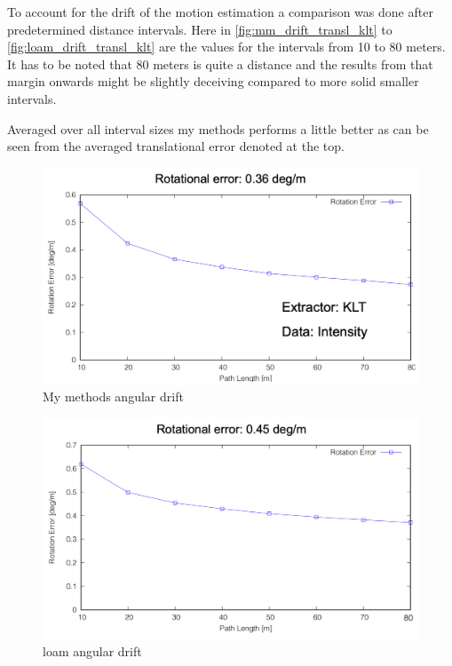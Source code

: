 {{{        To account for the drift of the motion estimation a comparison was done after predetermined distance intervals. Here in \cref{fig:mm_drift_transl_klt} to \cref{fig:loam_drift_transl_klt} are the values for the intervals from 10 to 80 meters. It has to be noted that 80 meters is quite a distance and the results from that margin onwards might be slightly deceiving compared to more solid smaller intervals. 
        
        Averaged over all interval sizes my methods performs a little better as can be seen from the averaged translational error denoted at the top.

        \clearpage

        \begin{figure}[ht]
            \centering
            \includegraphics[scale = 0.45]{images/results/mm_drift_angle.png}
            \caption{My methods angular drift}
            \label{fig:mm_drift_angle_klt}
        \end{figure}

        \begin{figure}[!ht]
            \centering
            \includegraphics[scale = 0.4]{images/results/loam_drift_angle.png}
            \caption{loam angular drift}
            \label{fig:loam_drift_angle_klt}
        \end{figure}

}}}
